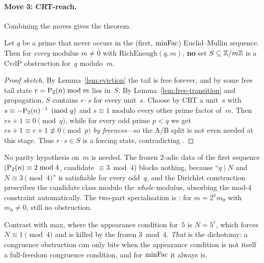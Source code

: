 \paragraph{Move 3: CRT-reach.}
Combining the moves gives the theorem.

\begin{keyresult}
\begin{theorem}
\label{thm:no-invariant}
Let $q$ be a prime that never occurs in the (first, $\mathrm{minFac}$)
Euclid--Mullin sequence.  Then for \emph{every} modulus $m \neq 0$ with
$\mathrm{RichEnough}(q,m)$, \textbf{no} set $S \subseteq \mathbb{Z}/m\mathbb{Z}$ is a
CvdP obstruction for~$q$ modulo~$m$.
\end{theorem}
\end{keyresult}

\begin{proof}[Proof sketch]
By Lemma~\ref{lem:eviction} the tail is free forever, and by
 some free tail state $r = \mathrm{P}_{2}(n) \bmod m$ lies
in~$S$.  By Lemma~\ref{lem:free-transition} and propagation, $S$
contains $r \cdot s$ for every unit~$s$.  Choose by CRT a unit~$s$ with
$s \equiv -\mathrm{P}_{2}(n)^{-1} \pmod q$ and $s \equiv 1$ modulo every other
prime factor of~$m$.  Then $r s + 1 \equiv 0 \pmod q$, while for every
odd prime $p < q$ we get $rs + 1 \equiv r + 1 \not\equiv 0 \pmod p$
\emph{by freeness}---so the A/B split is not even needed at this stage.
Thus $r \cdot s \in S$ is a forcing state, contradicting
.
\end{proof}

\noindent
No parity hypothesis on~$m$ is needed.  The frozen $2$-adic data of the
first sequence ($\mathrm{P}_{2}(n) \equiv 2 \bmod 4$, candidate
$\equiv 3 \bmod 4$) blocks nothing, because ``$q \mid N$ and
$N \equiv 3 \pmod 4$'' is satisfiable for every odd~$q$, and the
Dirichlet construction prescribes the candidate class modulo the
\emph{whole} modulus, absorbing the mod-$4$ constraint automatically.
The two-part specialisation is
:
for $m = 2^a m_0$ with $m_0 \neq 0$, still no obstruction.

Contrast with max, where the appearance condition for~$5$ is $N = 5^c$,
which forces $N \equiv 1 \pmod 4$ and is killed by the frozen
$3 \bmod 4$.  \emph{That} is the dichotomy: a congruence obstruction can
only bite when the appearance condition is not itself a full-freedom
congruence condition, and for $\mathrm{minFac}$ it always is.


